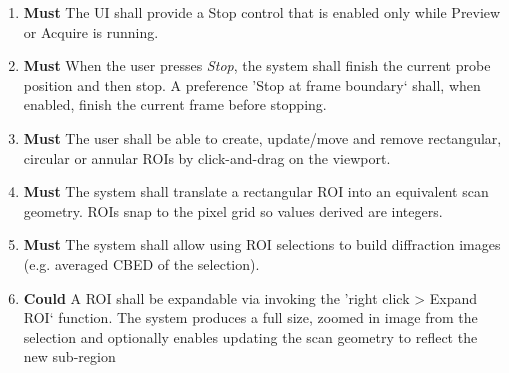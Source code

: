 \documentclass[10pt]{article}
\newcommand{\PriorityTag}[2]{%
    \colorbox{#2!25}{\footnotesize\textsf{\textbf{#1}}}\hspace{0.6em}}
\newcommand{\must}{\leavevmode\PriorityTag{Must}{green}}
\newcommand{\could}{\leavevmode\PriorityTag{Could}{cyan}}
\newcounter{reqgrp}[section] %
\newcounter{reqno}
\newcommand{\reqprefix}{GEN}
\newenvironment{requirements}[1]{%
    \renewcommand{\reqprefix}{#1}%
    \refstepcounter{reqgrp}%
    \setcounter{reqno}{0}%
    \begin{enumerate}[leftmargin=*]
    }{\end{enumerate}}
\begin{document}
\begin{requirements}{UI}
        \item \must {}
        {The UI shall provide a Stop control that is enabled only while Preview or Acquire is running.}

        \item \must {}
        {When the user presses \emph{Stop}, the system shall finish the current probe position and then stop. A preference 'Stop at frame boundary` shall, when enabled, finish the current frame before stopping.}


        \item \label{req:ui:roi} \must {}
        {The user shall be able to create, update/move and remove rectangular, circular or annular ROIs by click-and-drag on the viewport.}

        \item \must {}
        {The system shall translate a rectangular ROI into an equivalent scan geometry. ROIs snap to the pixel grid so values derived are integers.}

        \item \must {}
        {The system shall allow using ROI selections to build diffraction images (e.g. averaged CBED of the selection).}

        \item \could {}
        {A ROI shall be expandable via invoking the 'right click > Expand ROI` function. The system produces a full size, zoomed in image from the selection and optionally enables updating the scan geometry to reflect the new sub-region}


\end{requirements}
\end{document}

